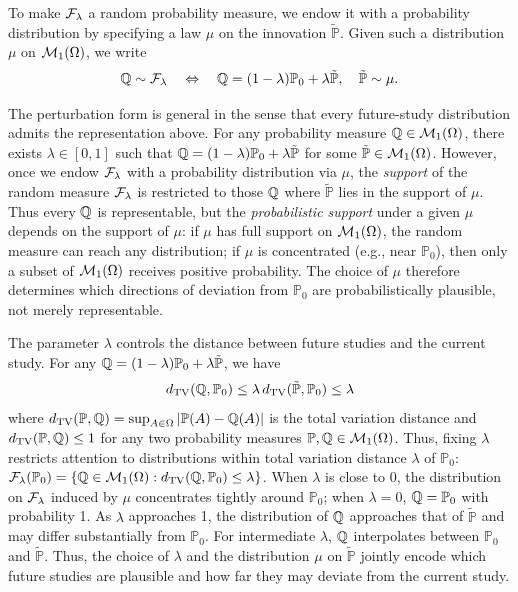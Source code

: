 \documentclass{article}
\newcommand{\PP}{\mathbb{P}}
\begin{document}
To make $\mathcal{F}_\lambda$ a random probability measure, we endow it with a probability distribution by specifying a law $\mu$ on the innovation $\tilde{\PP}$. Given such a distribution $\mu$ on $\mathcal{M}_1(\Omega)$, we write
\begin{align*}
    \Q \sim \cF_\lambda \quad\Leftrightarrow\quad \Q = (1-\lambda)\PP_0 + \lambda\tilde{\PP}, \quad \tilde{\PP} \sim \mu.
\end{align*}

The perturbation form is general in the sense that every future-study distribution admits the representation above. For any probability measure $\mathbb{Q} \in \mathcal{M}_1(\Omega)$, there exists $\lambda \in [0,1]$ such that $\Q = (1-\lambda)\PP_0 + \lambda\tilde{\PP}$ for some $\tilde{\PP} \in \cM_1(\Omega)$. However, once we endow $\mathcal{F}_\lambda$ with a probability distribution via $\mu$, the \emph{support} of the random measure $\mathcal{F}_\lambda$ is restricted to those $\mathbb{Q}$ where $\tilde{\PP}$ lies in the support of $\mu$. Thus every $\mathbb{Q}$ is representable, but the \emph{probabilistic support} under a given $\mu$ depends on the support of $\mu$: if $\mu$ has full support on $\mathcal{M}_1(\Omega)$, the random measure can reach any distribution; if $\mu$ is concentrated (e.g., near $\PP_0$), then only a subset of $\mathcal{M}_1(\Omega)$ receives positive probability. The choice of $\mu$ therefore determines which directions of deviation from $\PP_0$ are probabilistically plausible, not merely representable.

The parameter $\lambda$ controls the distance between future studies and the current study. For any $\Q = (1-\lambda)\PP_0 + \lambda\tilde{\PP}$, we have
\begin{align}\label{eq:distance-bound}
    d_{\mathrm{TV}}(\Q, \PP_0) \leq \lambda \, d_{\mathrm{TV}}(\tilde{\PP}, \PP_0) \leq \lambda
\end{align}
where $d_{\mathrm{TV}}(\PP, \Q) = \sup_{A \in \Omega} \left|\PP(A) - \Q(A)\right|$ is the total variation distance and $d_{\mathrm{TV}}(\PP, \Q) \leq 1$ for any two probability measures $\PP, \Q \in \cM_1(\Omega)$. Thus, fixing $\lambda$ restricts attention to distributions within total variation distance $\lambda$ of $\PP_0$: $\cF_\lambda(\PP_0) = \{\Q \in \cM_1(\Omega) : d_{\mathrm{TV}}(\Q, \PP_0) \leq \lambda\}$. When $\lambda$ is close to 0, the distribution on $\mathcal{F}_\lambda$ induced by $\mu$ concentrates tightly around $\PP_0$; when $\lambda = 0$, $\Q = \PP_0$ with probability 1. As $\lambda$ approaches 1, the distribution of $\mathbb{Q}$ approaches that of $\tilde{\PP}$ and may differ substantially from $\PP_0$. For intermediate $\lambda$, $\mathbb{Q}$ interpolates between $\PP_0$ and $\tilde{\PP}$. Thus, the choice of $\lambda$ and the distribution $\mu$ on $\tilde{\PP}$ jointly encode which future studies are plausible and how far they may deviate from the current study.
\end{document}
